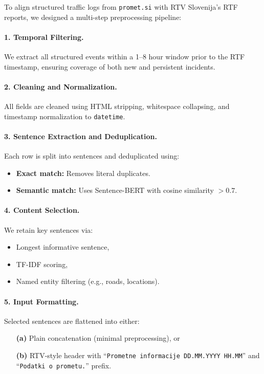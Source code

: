 To align structured traffic logs from \texttt{promet.si} with RTV Slovenija's RTF reports, we designed a multi-step preprocessing pipeline:

\paragraph{1. Temporal Filtering.}
We extract all structured events within a 1–8 hour window prior to the RTF timestamp, ensuring coverage of both new and persistent incidents.

\paragraph{2. Cleaning and Normalization.}
All fields are cleaned using HTML stripping, whitespace collapsing, and timestamp normalization to \texttt{datetime}.

\paragraph{3. Sentence Extraction and Deduplication.}
Each row is split into sentences and deduplicated using:
\begin{itemize}
  \item \textbf{Exact match:} Removes literal duplicates.
  \item \textbf{Semantic match:} Uses Sentence-BERT with cosine similarity $> 0.7$.
\end{itemize}

\paragraph{4. Content Selection.}
We retain key sentences via:
\begin{itemize}
  \item Longest informative sentence,
  \item TF-IDF scoring,
  \item Named entity filtering (e.g., roads, locations).
\end{itemize}

\paragraph{5. Input Formatting.}
Selected sentences are flattened into either:
\begin{itemize}
  \item[\textbf{(a)}] Plain concatenation (minimal preprocessing), or
  \item[\textbf{(b)}] RTV-style header with “\texttt{Prometne informacije DD.MM.YYYY HH.MM}” and “\texttt{Podatki o prometu.}” prefix.
\end{itemize}

